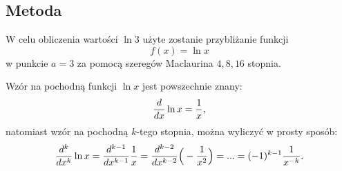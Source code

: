 \documentclass[11pt, wide, leqno]{mwart}
\begin{document}
\subsection{Metoda}

W celu obliczenia wartości $\ln3$ użyte zostanie przybliżanie funkcji
$$f(x)=\ln x$$
w punkcie $a=3$ za pomocą szeregów Maclaurina $4, 8, 16$ stopnia.

Wzór na pochodną funkcji $\ln x$ jest powszechnie znany:
$${d\over dx}\ln x=\frac1x,$$
natomiast wzór na pochodną $k$-tego stopnia, można wyliczyć w prosty sposób:
\begin{align}
    {d^k\over dx^k}\ln x={d^{k-1}\over dx^{k-1}}\frac1x={d^{k-2}\over dx^{k-2}}\Big(-\frac1{x^2}\Big)=...=(-1)^{k-1}\frac1{x^{-k}}.
\end{align}
\end{document}
